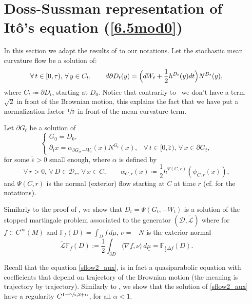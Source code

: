 \documentclass[10pt]{amsart}
\let\epsilon\varepsilon
\theoremstyle{plain}
\theoremstyle{definition}
\newcommand\df{\coloneqq}
\newcommand{\bqn}[1]{\begin{equation}\label{#1}}
\newcommand{\bqq}[1]{\begin{equation}}
\newcommand{\eqn}{\end{equation}}
\newcommand{\fo}{\forall\,}
\let\f\frac
\let\pa\partial
\let\wi\widetilde
\newcommand{\cD}{\mathcal{D}}
\providecommand{\cf}{cf.}\providecommand{\etc}{etc.}
\begin{document}
\section{Doss-Sussman representation of Itô's equation (\ref{6.5mod0})}
\label{appC}

In this section we adapt the results of \cite{zbMATH07470497} to our notations.
Let the stochastic mean curvature flow be a solution of:
\bqn{sflow}
\fo t\in[0,\tau),\,\fo y\in C_t, \qquad d \partial D_t(y)=\Bigl(dW_t+\f12 h^{D_t}(y)dt\Bigr)N^{D_t}(y),
\eqn
where $C_t\df\pa D_t$, starting at $D_0$.
Notice that contrarily to~\cite{zbMATH07470497} we don't have a term~$\sqrt2$ in front of the Brownian motion, this explains the fact that we have put a normalization factor $\sfrac12$ in front of the mean curvature term.

Let $\partial G_t$ be a solution of
\bqn{sflow2_aux}
\begin{cases}
G_0=D_0,\\
\pa_t x=\alpha_{\pa G_t,-W_t}(x)N^{G_t}(x),&\fo t\in[0,\wi\epsilon),\,\fo x\in \partial G_t,
\end{cases}
\eqn
for some $\wi\epsilon>0$ small enough, where $\alpha$ is defined by
\bqq{alpharhobeta}
\fo r>0,\,\fo D\in\cD_r,\,\fo x\in C,\qquad \alpha_{C,r}(x)\df \f12h^{\Psi(C,r)}(\psi_{C,r}(x)),
\eqn
and $\Psi(C,r)$ is the normal (exterior) flow starting at $C$ at time $r$ (\cf \cite[Chap.\,3 \& 4]{zbMATH07470497} for the notations).

Similarly to the proof of \cite[Th.\,17]{zbMATH07470497}, we show that $D_t = \Psi(G_t,-W_t)$ is a solution of the stopped martingale problem associated to the generator $(\mathcal{D},\wi{\mathcal{L}})$ where for $f \in C^{\infty}(M) $ and $ \mathbb{F}_f (D) = \int_D f \,d\mu$, $\nu = -N $ is the exterior normal
\[
\wi{\mathcal{L}} \mathbb{F}_f (D):= \frac12 \int_{\partial D} \langle \nabla f, \nu \rangle \,d\underline{\mu} = \mathbb{F}_{\frac12 \Delta f}(D).
\]


Recall that the equation \eqref{sflow2_aux}, is in fact a quasiparabolic equation with coefficients that depend on trajectory of the Brownian motion (the meaning is trajectory by trajectory). Similarly to \cite[\S 4.1]{zbMATH07470497}, we show that the solution of \eqref{sflow2_aux} have a regularity $ C^{1+\sfrac{\alpha}{2},2 + \alpha}$, for all $\alpha < 1. $
\end{document}
